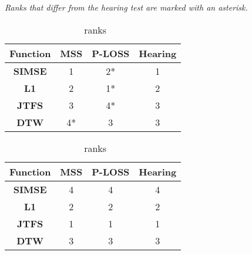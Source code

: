 \noindent\textit{Ranks that differ from the hearing test are marked with an asterisk.}

\begin{table}[htbp]
\centering
\begin{minipage}{0.45\textwidth}
    \centering
    \begin{tabular}{|c|c|c|c|}
    \hline
    \textbf{Function} & \textbf{MSS} & \textbf{P-LOSS} & \textbf{Hearing} \\
    \hline
    \textbf{SIMSE} & 1\phantom{*} & 2* & 1\phantom{*} \\
    \textbf{L1}    & 2\phantom{*} & 1* & 2\phantom{*} \\
    \textbf{JTFS}  & 3\phantom{*} & 4* & 3\phantom{*} \\
    \textbf{DTW}   & 4*           & 3\phantom{*} & 3\phantom{*} \\
    \hline
    \end{tabular}
    \caption{\footnotesize \BPNoise~ranks}
    \label{tab:p0}
\end{minipage}%
\hspace{1cm}
\begin{minipage}{0.45\textwidth}
    \centering
    \begin{tabular}{|c|c|c|c|}
    \hline
    \textbf{Function}& \textbf{MSS} & \textbf{P-LOSS} & \textbf{Hearing} \\
    \hline
    \textbf{SIMSE} & 4\phantom{*} & 4\phantom{*} & 4\phantom{*} \\
    \textbf{L1} & 2\phantom{*} & 2\phantom{*} & 2\phantom{*} \\
    \textbf{JTFS} & 1\phantom{*} & 1\phantom{*} & 1\phantom{*} \\
    \textbf{DTW} & 3\phantom{*} & 3\phantom{*} & 3\phantom{*} \\
    \hline
    \end{tabular}
    \caption{\footnotesize \AddSineSaw~ranks}
    \label{tab:p1}
\end{minipage}

\vspace{0.5cm} %


\end{table}

